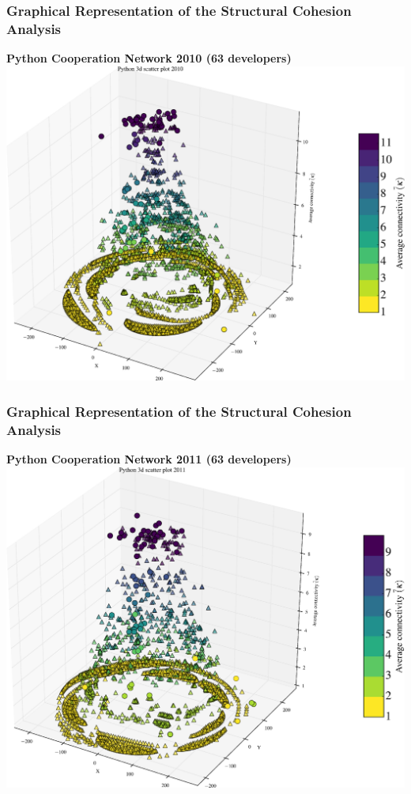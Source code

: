 \documentclass[ignorenonframetext,red,8pt,notes=hide]{beamer}
\begin{document}
\begin{frame}
\frametitle{Graphical Representation of the Structural Cohesion Analysis}

\begin{center}
\textbf{Python Cooperation Network 2010 (63 developers)}
\includegraphics[scale=0.25]{img/3d_scatter_python_2010}
\end{center}

\end{frame}

\begin{frame}
\frametitle{Graphical Representation of the Structural Cohesion Analysis}

\begin{center}
\textbf{Python Cooperation Network 2011 (63 developers)}
\includegraphics[scale=0.25]{img/3d_scatter_python_2011}
\end{center}

\end{frame}
\end{document}
